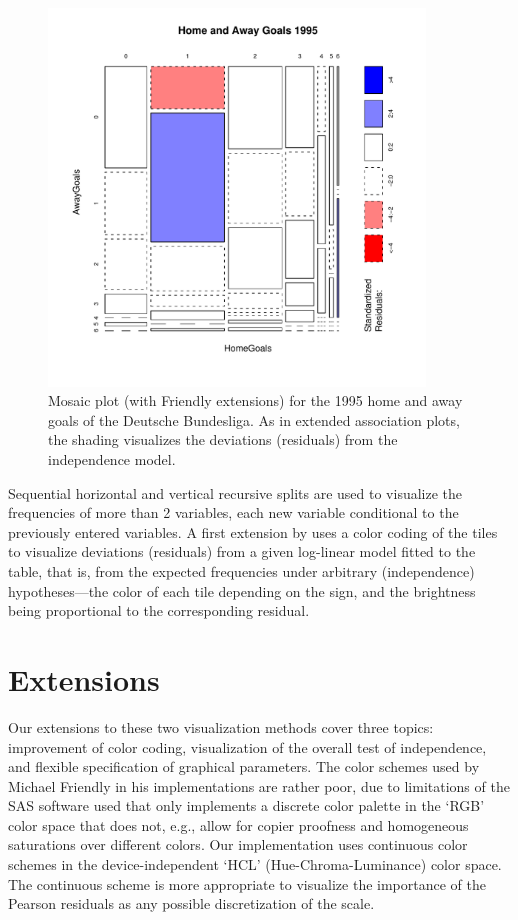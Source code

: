 \documentclass[10pt]{article}
\begin{document}
\begin{figure}[htbp]
  \begin{center}
    \includegraphics[width = 10cm]{mosaicbase}
    \caption{Mosaic plot (with Friendly extensions)
    for the 1995 home and away goals of the Deutsche Bundesliga. As in
    extended association plots, the shading visualizes the deviations
    (residuals) from the independence model.}
    \label{fig:mosaicbase}
  \end{center}
\end{figure}

Sequential horizontal and vertical recursive splits are used to
visualize the frequencies of more than 2 variables, each new variable
conditional to the previously entered variables. A first extension by
\cite[][]{vcd:Friendly:1994} uses a color coding of the tiles to visualize deviations
(residuals) from a given log-linear model fitted to the table, that is, from
the expected frequencies under arbitrary (independence)
hypotheses---the color of each tile depending on the sign, and the
brightness being proportional to the corresponding residual.

        
\section{Extensions}
Our extensions to these two visualization methods cover three topics:
improvement of color coding, visualization of the overall
test of independence, and flexible specification of graphical
parameters.
The color schemes used by Michael Friendly in his implementations are
rather poor, due to limitations of the SAS software used that only
implements a discrete color palette in the `RGB' color space that does not, e.g., 
allow for copier proofness and homogeneous saturations over different colors. Our
implementation uses continuous color schemes in the device-independent
`HCL' (Hue-Chroma-Luminance) color space. The continuous scheme is
more appropriate to visualize the importance of the Pearson residuals
as any possible discretization of the scale.
\end{document}
